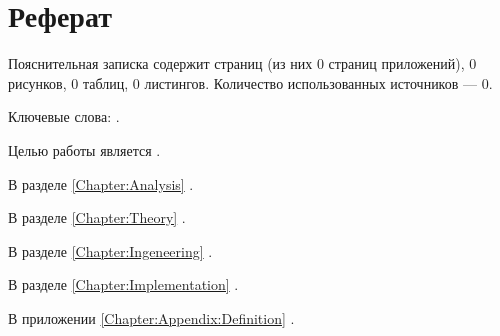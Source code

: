 \chapter*{Реферат}
\thispagestyle{plain}

Пояснительная записка содержит \pageref{LastPage} страниц (из них 0 страниц приложений), 0 рисунков, 0 таблиц, 0 листингов. Количество использованных источников --- 0.

Ключевые слова: .

Целью работы является .

В разделе \ref{Chapter:Analysis} .

В разделе \ref{Chapter:Theory} .

В разделе \ref{Chapter:Ingeneering} .

В разделе \ref{Chapter:Implementation} . 

В приложении \ref{Chapter:Appendix:Definition} .